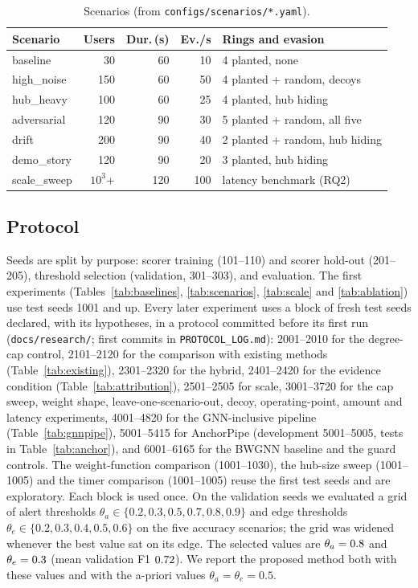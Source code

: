 \begin{table}[t]
\centering
\caption{Scenarios (from \texttt{configs/scenarios/*.yaml}).}
\label{tab:scenario-def}
\small
\setlength{\tabcolsep}{3pt}
\begin{tabular}{lrrrl}
\toprule
Scenario & Users & Dur.\,(s) & Ev./s & Rings and evasion \\
\midrule
baseline & 30 & 60 & 10 & 4 planted, none \\
high\_noise & 150 & 60 & 50 & 4 planted + random, decoys \\
hub\_heavy & 100 & 60 & 25 & 4 planted, hub hiding \\
adversarial & 120 & 90 & 30 & 5 planted + random, all five \\
drift & 200 & 90 & 40 & 2 planted + random, hub hiding \\
demo\_story & 120 & 90 & 20 & 3 planted, hub hiding \\
scale\_sweep & $10^3$+ & 120 & 100 & latency benchmark (RQ2) \\
\bottomrule
\end{tabular}
\end{table}

\subsection{Protocol}
\label{sec:protocol}
Seeds are split by purpose: scorer training (101--110) and scorer hold-out
(201--205), threshold selection (validation, 301--303), and evaluation. The
first experiments (Tables~\ref{tab:baselines}, \ref{tab:scenarios},
\ref{tab:scale} and \ref{tab:ablation}) use test seeds 1001 and up. Every later
experiment uses a block of fresh test seeds declared, with its hypotheses, in a
protocol committed before its first run (\texttt{docs/research/}; first commits in
\texttt{PROTOCOL\_LOG.md}): 2001--2010 for the degree-cap control, 2101--2120 for
the comparison with existing methods (Table~\ref{tab:existing}), 2301--2320 for
the hybrid, 2401--2420 for the evidence condition (Table~\ref{tab:attribution}),
2501--2505 for scale, 3001--3720 for the cap sweep, weight shape,
leave-one-scenario-out, decoy, operating-point, amount and latency experiments,
4001--4820 for the GNN-inclusive pipeline (Table~\ref{tab:gnnpipe}), 5001--5415
for AnchorPipe (development 5001--5005, tests in Table~\ref{tab:anchor}), and
6001--6165 for the BWGNN baseline and the guard controls. The weight-function
comparison (1001--1030), the hub-size sweep (1001--1005) and the timer
comparison (1001--1005) reuse the first test seeds and are exploratory.
Each block is used once.
On the validation seeds we evaluated a grid of alert thresholds
$\theta_a\in\{0.2,0.3,0.5,0.7,0.8,0.9\}$ and edge thresholds
$\theta_e\in\{0.2,0.3,0.4,0.5,0.6\}$ on the five accuracy scenarios; the grid was
widened whenever the best value sat on its edge. The selected values are
$\theta_a=0.8$ and $\theta_e=0.3$ (mean validation F1
$0.72$). We report the proposed method both with these values and with
the a-priori values $\theta_a=\theta_e=0.5$.

